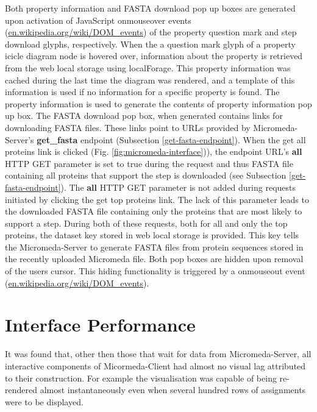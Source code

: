 Both property information and FASTA download pop up boxes are generated upon activation of JavaScript onmouseover events \cite{dom-events} (\href{en.wikipedia.org/wiki/DOM\_events}{en.wikipedia.org/wiki/DOM\_events}) of the property question mark and step download glyphs, respectively. When the a question mark glyph of a property icicle diagram node is hovered over, information about the property is retrieved from the web local storage using localForage. This property information was cached during the last time the diagram was rendered, and a template of this information is used if no information for a specific property is found. The property information is used to generate the contents of property information pop up box. The FASTA download pop box, when generated contains links for downloading FASTA files. These links point to URLs provided by Micromeda-Server's \textbf{get\_fasta} endpoint (Subsection \ref{get-fasta-endpoint}). When the get all proteins link is clicked (Fig. \ref{fig:micromeda-interface})), the endpoint URL's \textbf{all} HTTP GET parameter is set to true during the request and thus FASTA file containing all proteins that support the step is downloaded (see Subsection \ref{get-fasta-endpoint}). The \textbf{all} HTTP GET parameter is not added during requests initiated by clicking the get top proteins link. The lack of this parameter leads to the downloaded  FASTA file containing only the proteins that are most likely to support a step. During both of these requests, both for all and only the top proteins, the dataset key stored in web local storage is provided. This key tells the Micromeda-Server to generate FASTA files from protein sequences stored in the recently uploaded Micromeda file. Both pop boxes are hidden upon removal of the users cursor. This hiding functionality is triggered by a onmouseout event \cite{dom-events} (\href{en.wikipedia.org/wiki/DOM\_events}{en.wikipedia.org/wiki/DOM\_events}).

\section{Interface Performance}

It was found that, other then those that wait for data from Micromeda-Server, all interactive components of Micormeda-Client had almost no visual lag attributed to their construction. For example the visualisation was capable of being re-rendered almost instantaneously even when several hundred rows of assignments were to be displayed.


